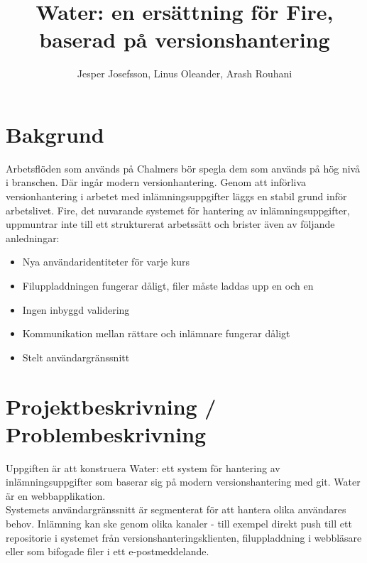 \documentclass[11pt,oneside]{article}
\title{Water: en ersättning för Fire, baserad på versionshantering}
\author{Jesper Josefsson, Linus Oleander, Arash Rouhani}
\begin{document}

\maketitle

%
%


\setlength{\parindent}{1em}

\section{Bakgrund}
\label{bakgrund:}

Arbetsflöden som används på Chalmers bör spegla dem som används på hög nivå i branschen.
Där ingår modern versionhantering. Genom att införliva versionhantering i arbetet med inlämningsuppgifter
läggs en stabil grund inför arbetslivet.
Fire, det nuvarande systemet för hantering av inlämningsuppgifter, uppmuntrar inte till ett strukturerat arbetssätt och brister även av följande anledningar:

\begin{itemize}

\item Nya användaridentiteter för varje kurs
\item Filuppladdningen fungerar dåligt, filer måste laddas upp en och en
\item Ingen inbyggd validering
\item Kommunikation mellan rättare och inlämnare fungerar dåligt
\item Stelt användargränssnitt
\end{itemize}

\section{Projektbeskrivning / Problembeskrivning}
\label{projektbeskrivningproblembeskrivning}

Uppgiften är att konstruera Water: ett system för hantering av inlämningsuppgifter 
som baserar sig på modern versionshantering med git. 
Water är en webbapplikation. \\

Systemets användargränssnitt är segmenterat för att hantera olika användares behov. Inlämning kan ske genom olika kanaler - till exempel direkt push till ett repositorie i systemet från versionshanteringsklienten, filuppladdning i webbläsare eller som bifogade filer i ett e-postmeddelande. \\
\end{document}
